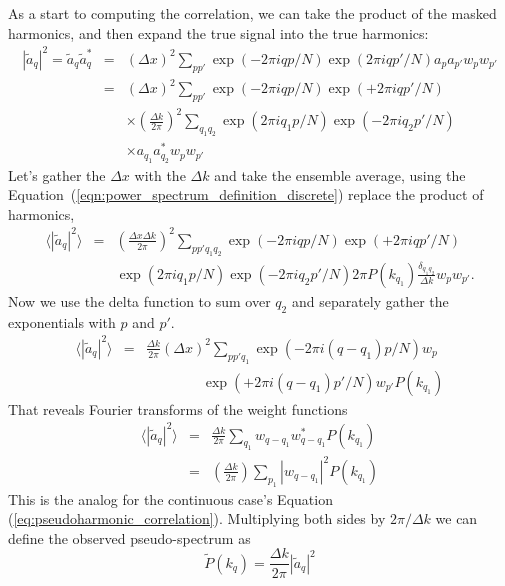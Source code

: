  As a start to computing the correlation, we can take the product of the masked harmonics, and then expand the true signal into the true harmonics:
 \begin{eqnarray}
   |\tilde a_q |^2 = \tilde a_q \tilde a_q^* &=&  (\Delta x)^2 \sum_{pp'} \exp(-2\pi i qp/N) \exp(2\pi i qp'/N) a_p  a_{p'} w_p w_{p'}  \nonumber \\
   &=&  (\Delta x)^2 \sum_{pp'} \exp(-2\pi i qp/N) \exp(+2\pi i qp'/N) \nonumber \\
   & & \times   \left(\frac{\Delta k}{2\pi}\right)^2 \sum_{q_1 q_2}  \exp(2\pi i q_1 p/N) \exp(-2\pi i q_2 p'/N) \nonumber \\
   & & \times a_{q_1} a^*_{q_2} w_p w_{p'}
 \end{eqnarray}
Let's gather the $\Delta x$ with the $\Delta k$ and take the ensemble average, using the Equation~(\ref{eqn:power_spectrum_definition_discrete}) replace the product of harmonics,
 \begin{eqnarray}
 \langle  |\tilde a_q |^2 \rangle &=& \left(\frac{\Delta x\Delta k}{2\pi}\right)^2  \sum_{pp'q_1q_2} \exp(-2\pi i qp/N)  \exp(+2\pi i qp'/N) \nonumber \\
 & & \exp(2\pi i q_1 p/N) \exp(-2\pi i q_2 p'/N){2\pi} P(k_{q_1}) \frac{\delta_{q_1 q_2}}{\Delta k} w_p w_{p'}.
 \end{eqnarray}
Now we use the delta function to sum over $q_2$ and separately gather the exponentials with $p$ and $p'$.  
\begin{eqnarray}
 \langle   |\tilde a_q |^2 \rangle &=&  \frac{\Delta k}{2\pi}\left(\Delta x \right)^2  \sum_{pp'q_1}\exp(-2\pi i (q-q_1)p/N)  w_p \nonumber \\
  & & \qquad \qquad \exp(+2\pi i (q-q_1) p'/N)  w_{p'}   P(k_{q_1})
\end{eqnarray}
That reveals Fourier transforms of the weight functions
\begin{eqnarray}
  \langle  |\tilde a_q |^2 \rangle &=& \frac{\Delta k}{2\pi}  \sum_{q_1} w_{q-q_1} w_{q-q_1}^*  P(k_{q_1}) \\ \nonumber
  &=& \left(\frac{\Delta k}{2\pi}\right)  \sum_{p_1} |w_{q-q_1}|^2  P(k_{q_1})
\end{eqnarray}
This is the analog for the continuous case's Equation (\ref{eq:pseudoharmonic_correlation}).  Multiplying both sides by $2\pi/\Delta k$ we can define the observed pseudo-spectrum as
\begin{equation}
  \tilde P(k_q) = \frac{\Delta k}{2\pi} |\tilde a_q |^2
\end{equation}
